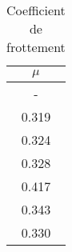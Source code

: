 \begin{table}
\centering
\begin{tabular}{|c|}
\hline
$\mu$ \\
\hline
- \\
\hline
0.319 \\
\hline
0.324 \\
\hline
0.328 \\
\hline
0.417 \\
\hline
0.343 \\
\hline
0.330 \\
\hline
\end{tabular}
\caption{Coefficient de frottement}
\label{table:coeffee}
\end{table}
